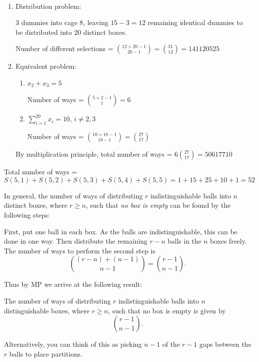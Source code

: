 \begin{solution} \
\begin{enumerate}[label=(\alph*)]
\item Distribution problem:

3 dummies into cage 8, leaving $15-3=12$ remaining identical dummies to be distributed into 20 distinct boxes.

Number of different selections = $\binom{12+20-1}{20-1}=\binom{31}{12}=\boxed{141120525}$

\item Equivalent problem:
\begin{enumerate}[label=(\roman*)]
    \item $x_2+x_3=5$

    Number of ways = $\binom{5+2-1}{1}=6$

    \item $\sum_{i=1}^{20}x_i=10$, $i\neq2,3$

    Number of ways = $\binom{10+18-1}{18-1}=\binom{27}{17}$
\end{enumerate}
By multiplication principle, total number of ways = $6\binom{27}{17}=\boxed{50617710}$
\end{enumerate}

Total number of ways = $S(5,1)+S(5,2)+S(5,3)+S(5,4)+S(5,5)=1+15+25+10+1=\boxed{52}$
\end{solution}

In general, the number of ways of distributing $r$ indistinguishable balls into $n$ distinct boxes, where $r\ge n$, such that \emph{no box is empty} can be found by the following steps:

First, put one ball in each box. As the balls are indistinguishable, this can be done in one way. Then distribute the remaining $r-n$ balls in the $n$ boxes freely. The number of ways to perform the second step is
\[ \binom{(r-n)+(n-1)}{n-1}=\binom{r-1}{n-1}. \]

Thus by MP we arrive at the following result:

\begin{theorem}
The number of ways of distributing $r$ indistinguishable balls into $n$ distinguishable boxes, where $r\ge n$, such that no box is empty is given by
\begin{equation}
\binom{r-1}{n-1}.
\end{equation}
\end{theorem}

\begin{remark}
Alternatively, you can think of this as picking $n-1$ of the $r-1$ gaps between the $r$ balls to place partitions.
\end{remark}

